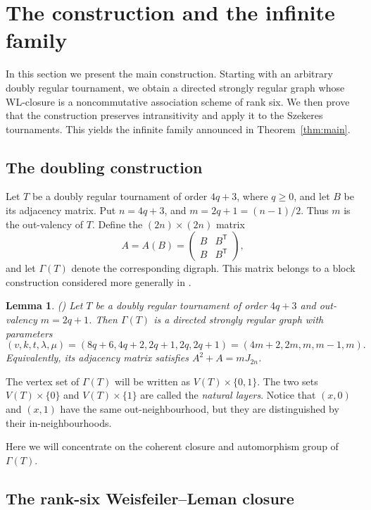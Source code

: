 \documentclass[11pt]{article}
\newtheorem{lemma}[theorem]{Lemma}
\theoremstyle{definition}
\theoremstyle{remark}
\begin{document}
\section{The construction and the infinite family}
\label{sec:main}

In this section we present the main construction.  Starting with an arbitrary
doubly regular tournament, we obtain a directed strongly regular graph whose
WL-closure is a noncommutative association scheme of rank six.
We then prove that the construction preserves intransitivity and apply it to
the Szekeres tournaments.  This yields the infinite family announced in
Theorem~\ref{thm:main}.

\subsection{The doubling construction}

Let $T$ be a doubly regular tournament of order $4q+3$, where $q\geq0$, and
let $B$ be its adjacency matrix.  Put
$n=4q+3$, and  $m=2q+1=(n-1)/2$.
Thus $m$ is the out-valency of $T$.  
Define the $(2n)\times(2n)$ matrix
\[ A=A(B)=
 \begin{pmatrix}
  B&B^{\mathsf T}\\
  B&B^{\mathsf T}
 \end{pmatrix},
\]
and let $\Gamma(T)$ denote the corresponding digraph.  This matrix belongs to
a block construction considered more generally in \cite[Lemma 4.2]{ag}.  

\begin{lemma}(\cite[Lemma 4.2]{ag})
\label{thm:doubling}
Let $T$ be a doubly regular tournament of order $4q+3$ and out-valency
$m=2q+1$.  Then $\Gamma(T)$ is a directed strongly regular graph with
parameters
\[ (v,k,t,\lambda,\mu)=(8q+6,4q+2,2q+1,2q,2q+1)=(4m+2,2m,m,m-1,m). \]
Equivalently, its adjacency matrix satisfies
$ A^2+A=mJ_{2n}$.
\end{lemma}


The vertex set of $\Gamma(T)$ will be written as $ V(T)\times\{0,1\}$.
The two sets $V(T)\times\{0\}$ and $V(T)\times\{1\}$ are called the
\emph{natural layers}.  Notice that $(x,0)$ and $(x,1)$ have the same
out-neighbourhood, but they are distinguished by their in-neighbourhoods.

Here we will concentrate on the coherent
closure and automorphism group of $\Gamma(T)$.

\subsection{The rank-six Weisfeiler--Leman closure}
\end{document}
